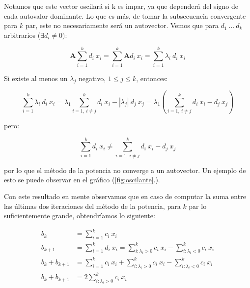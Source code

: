 \vspace{1em}
\noindent Notamos que este vector oscilará si k es impar, ya que dependerá del signo de cada autovalor dominante. Lo que es más, de tomar la subsecuencia convergente para $k$ par, este no necesariamente será un autovector. Vemos que para $d_1\ ...\ d_k$ arbitrarios ($\exists d_i \neq 0)$:

\begin{equation*}
    \mathbf{A} \sum_{i=1}^{k} d_i\ x_i = \sum_{i=1}^{k} \mathbf{A} d_i\ x_i = \sum_{i=1}^{k} \lambda_i\ d_i\ x_i 
\end{equation*}

\vspace{1em} 
\noindent Si existe al menos un $\lambda_j$ negativo, $1 \leq j \leq k$, entonces:

\begin{equation*}
    \sum_{i=1}^{k} \lambda_i\ d_i\ x_i = \lambda_1 \sum_{i = 1,\ i \neq j}^{k} d_i\ x_i - |\lambda_j|\ d_j\ x_j = \lambda_1 (\sum_{i = 1,\ i \neq j}^{k} d_i\ x_i - d_j\ x_j)
\end{equation*}

\vspace{1em} 
\noindent pero:

\begin{equation*}
    \sum_{i=1}^{k} d_i\ x_i \neq \sum_{i = 1,\ i \neq j}^{k} d_i\ x_i - d_j\ x_j
\end{equation*}

\vspace{1em}
\noindent por lo que el método de la potencia no converge a un autovector. 
Un ejemplo de esto se puede observar en el gráfico (\ref{fig:oscilante}.).

\vspace{1em}
Con este resultado en mente observamos que en caso de computar la suma entre las últimas dos iteraciones del método de la potencia, para $k$ par lo suficientemente grande, obtendríamos lo siguiente:

\vspace{1em}
\begin{align*}
    b_k &= \sum_{i=1}^{k} c_i\ x_i \\
    b_{k+1} &= \sum_{i=1}^{k} d_i\ x_i = \sum_{i: \lambda_i > 0}^{k} c_i\ x_i - \sum_{i: \lambda_i < 0}^{k} c_i\ x_i \\ 
    b_k + b_{k+1} &= \sum_{i=1}^{k} c_i\ x_i + \sum_{i: \lambda_i > 0}^{k} c_i\ x_i - \sum_{i: \lambda_i < 0}^{k} c_i\ x_i   \\ 
    b_k + b_{k+1} &= 2 \sum_{i: \lambda_i > 0}^{k} c_i\ x_i
\end{align*}

